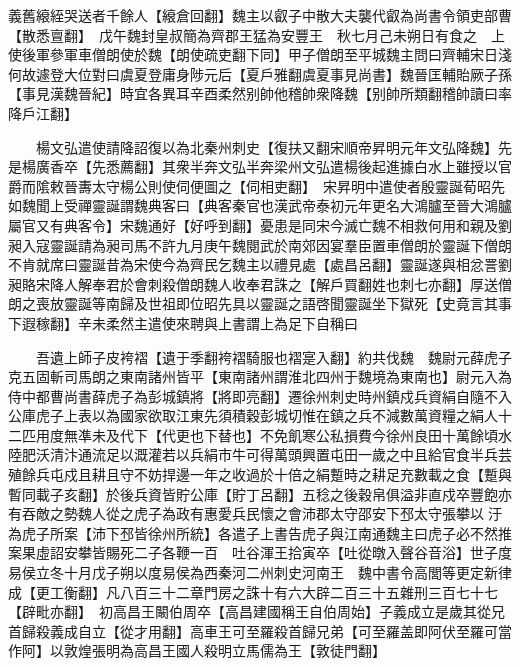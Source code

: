 義舊縗絰哭送者千餘人【縗倉回翻】魏主以叡子中散大夫襲代叡為尚書令領吏部曹【散悉亶翻】　戊午魏封皇叔簡為齊郡王猛為安豐王　秋七月己未朔日有食之　上使後軍參軍車僧朗使於魏【朗使疏吏翻下同】甲子僧朗至平城魏主問曰齊輔宋日淺何故遽登大位對曰虞夏登庸身陟元后【夏戶雅翻虞夏事見尚書】魏晉匡輔貽厥子孫【事見漢魏晉紀】時宜各異耳辛酉柔然别帥他稽帥衆降魏【别帥所類翻稽帥讀曰率降戶江翻】

　　楊文弘遣使請降詔復以為北秦州刺史【復扶又翻宋順帝昇明元年文弘降魏】先是楊廣香卒【先悉薦翻】其衆半奔文弘半奔梁州文弘遣楊後起進據白水上雖授以官爵而隂敕晉夀太守楊公則使伺便圖之【伺相吏翻】　宋昇明中遣使者殷靈誕荀昭先如魏聞上受禪靈誕謂魏典客曰【典客秦官也漢武帝泰初元年更名大鴻臚至晉大鴻臚屬官又有典客令】宋魏通好【好呼到翻】憂患是同宋今滅亡魏不相救何用和親及劉昶入寇靈誕請為昶司馬不許九月庚午魏閱武於南郊因宴羣臣置車僧朗於靈誕下僧朗不肯就席曰靈誕昔為宋使今為齊民乞魏主以禮見處【處昌呂翻】靈誕遂與相忿詈劉昶賂宋降人解奉君於會刺殺僧朗魏人收奉君誅之【解戶買翻姓也刺七亦翻】厚送僧朗之喪放靈誕等南歸及世祖即位昭先具以靈誕之語啓聞靈誕坐下獄死【史竟言其事下遐稼翻】辛未柔然主遣使來聘與上書謂上為足下自稱曰

　　吾遺上師子皮袴褶【遺于季翻袴褶騎服也褶寔入翻】約共伐魏　魏尉元薛虎子克五固斬司馬朗之東南諸州皆平【東南諸州謂淮北四州于魏境為東南也】尉元入為侍中都曹尚書薛虎子為彭城鎮將【將即亮翻】遷徐州刺史時州鎮戍兵資絹自隨不入公庫虎子上表以為國家欲取江東先須積穀彭城切惟在鎮之兵不減數萬資糧之絹人十二匹用度無凖未及代下【代更也下替也】不免飢寒公私損費今徐州良田十萬餘頃水陸肥沃清汴通流足以溉灌若以兵絹市牛可得萬頭興置屯田一歲之中且給官食半兵芸殖餘兵屯戍且耕且守不妨捍邊一年之收過於十倍之絹蹔時之耕足充數載之食【蹔與暫同載子亥翻】於後兵資皆貯公庫【貯丁呂翻】五稔之後穀帛俱溢非直戍卒豐飽亦有吞敵之勢魏人從之虎子為政有惠愛兵民懷之會沛郡太守邵安下邳太守張攀以汙為虎子所案【沛下邳皆徐州所統】各遣子上書告虎子與江南通魏主曰虎子必不然推案果虛詔安攀皆賜死二子各鞭一百　吐谷渾王拾寅卒【吐從暾入聲谷音浴】世子度易侯立冬十月戊子朔以度易侯為西秦河二州刺史河南王　魏中書令高閭等更定新律成【更工衡翻】凡八百三十二章門房之誅十有六大辟二百三十五雜刑三百七十七【辟毗亦翻】　初高昌王闞伯周卒【高昌建國稱王自伯周始】子義成立是歲其從兄首歸殺義成自立【從才用翻】高車王可至羅殺首歸兄弟【可至羅盖即阿伏至羅可當作阿】以敦煌張明為高昌王國人殺明立馬儒為王【敦徒門翻】

